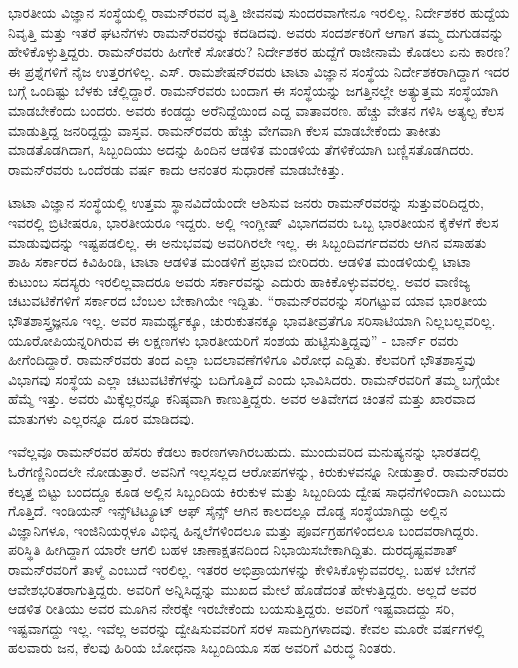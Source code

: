 ಭಾರತೀಯ ವಿಜ್ಞಾನ ಸಂಸ್ಥೆಯಲ್ಲಿ ರಾಮನ್‍ರವರ ವೃತ್ತಿ ಜೀವನವು ಸುಂದರವಾಗೇನೂ ಇರಲಿಲ್ಲ. ನಿರ್ದೇಶಕರ ಹುದ್ದೆಯ ನಿವೃತ್ತಿ ಮತ್ತು ಇತರೆ ಘಟನೆಗಳು ರಾಮನ್‍ರವರನ್ನು ಕದಡಿದವು. ಅವರು ಸಂದರ್ಶಕರಿಗೆ ಆಗಾಗ ತಮ್ಮ ದುಗುಡವನ್ನು ಹೇಳಿಕೊಳ್ಳುತ್ತಿದ್ದರು. ರಾಮನ್‍ರವರು ಹೀಗೇಕೆ ಸೋತರು? ನಿರ್ದೇಶಕರ ಹುದ್ದೆಗೆ ರಾಜೀನಾಮೆ ಕೊಡಲು ಏನು ಕಾರಣ? ಈ ಪ್ರಶ್ನೆಗಳಿಗೆ ನೈಜ ಉತ್ತರಗಳಿಲ್ಲ. ಎಸ್. ರಾಮಶೇಷನ್‍ರವರು ಟಾಟಾ ವಿಜ್ಞಾನ ಸಂಸ್ಥೆಯ ನಿರ್ದೇಶಕರಾಗಿದ್ದಾಗ ಇದರ ಬಗ್ಗೆ ಒಂದಿಷ್ಟು ಬೆಳಕು ಚೆಲ್ಲಿದ್ದಾರೆ. ರಾಮನ್‍ರವರು ಬಂದಾಗ ಈ ಸಂಸ್ಥೆಯನ್ನು ಜಗತ್ತಿನಲ್ಲೇ ಅತ್ಯುತ್ತಮ ಸಂಸ್ಥೆಯಾಗಿ ಮಾಡಬೇಕೆಂದು ಬಂದರು. ಅವರು ಕಂಡದ್ದು ಅರೆನಿದ್ದೆಯಿಂದ ಎದ್ದ ವಾತಾವರಣ. ಹೆಚ್ಚು ವೇತನ ಗಳಿಸಿ ಅತ್ಯಲ್ಪ ಕೆಲಸ ಮಾಡುತ್ತಿದ್ದ ಜನರಿದ್ದದ್ದು ವಾಸ್ತವ. ರಾಮನ್‍ರವರು ಹೆಚ್ಚು ವೇಗವಾಗಿ ಕೆಲಸ ಮಾಡಬೇಕೆಂದು ತಾಕೀತು ಮಾಡತೊಡಗಿದಾಗ, ಸಿಬ್ಬಂದಿಯು ಅದನ್ನು ಹಿಂದಿನ ಆಡಳಿತ ಮಂಡಳಿಯ ತೆಗಳಿಕೆಯಾಗಿ ಬಣ್ಣಿಸತೊಡಗಿದರು. ರಾಮನ್‍ರವರು ಒಂದೆರಡು ವರ್ಷ ಕಾದು ಆನಂತರ ಸುಧಾರಣೆ ಮಾಡಬೇಕಿತ್ತು.

ಟಾಟಾ ವಿಜ್ಞಾನ ಸಂಸ್ಥೆಯಲ್ಲಿ ಉತ್ತಮ ಸ್ಥಾನವಿದೆಯೆಂದೇ ಆಶಿಸುವ ಜನರು ರಾಮನ್‍ರವರನ್ನು ಸುತ್ತುವರಿದಿದ್ದರು, ಇವರಲ್ಲಿ ಬ್ರಿಟೀಷರೂ, ಭಾರತೀಯರೂ ಇದ್ದರು. ಅಲ್ಲಿ ಇಂಗ್ಲೀಷ್ ವಿಭಾಗದವರು ಒಬ್ಬ ಭಾರತೀಯನ ಕೈಕೆಳಗೆ ಕೆಲಸ ಮಾಡುವುದನ್ನು ಇಷ್ಟಪಡಲಿಲ್ಲ. ಈ ಅನುಭವವು ಅವರಿಗಿರಲೇ ಇಲ್ಲ. ಈ ಸಿಬ್ಬಂದಿವರ್ಗದವರು ಆಗಿನ ವಸಾಹತು ಶಾಹಿ ಸರ್ಕಾರದ ಕಿವಿಹಿಂಡಿ, ಟಾಟಾ ಆಡಳಿತ ಮಂಡಳಿಗೆ ಪ್ರಭಾವ ಬೀರಿದರು. ಆಡಳಿತ ಮಂಡಳಿಯಲ್ಲಿ ಟಾಟಾ ಕುಟುಂಬ ಸದಸ್ಯರು ಇರಲಿಲ್ಲವಾದರೂ ಅವರು ಸರ್ಕಾರವನ್ನು ಎದುರು ಹಾಕಿಕೊಳ್ಳುವವರಲ್ಲ. ಅವರ ವಾಣಿಜ್ಯ ಚಟುವಟಿಕೆಗಳಿಗೆ ಸರ್ಕಾರದ ಬೆಂಬಲ ಬೇಕಾಗಿಯೇ ಇದ್ದಿತು. “ರಾಮನ್‍ರವರನ್ನು ಸರಿಗಟ್ಟುವ ಯಾವ ಭಾರತೀಯ ಭೌತಶಾಸ್ತ್ರಜ್ಞನೂ ಇಲ್ಲ. ಅವರ ಸಾಮರ್ಥ್ಯಕ್ಕೂ, ಚುರುಕುತನಕ್ಕೂ ಭಾವತೀವ್ರತೆಗೂ ಸರಿಸಾಟಿಯಾಗಿ ನಿಲ್ಲಬಲ್ಲವರಿಲ್ಲ. ಯೂರೋಪಿಯನ್ನರಿಗಿರುವ ಈ ಲಕ್ಷಣಗಳು ಭಾರತೀಯರಿಗೆ ಸಂಶಯ ಹುಟ್ಟಿಸುತ್ತಿದ್ದವು” - ಬಾರ್ನ್ ರವರು ಹೀಗೆಂದಿದ್ದಾರೆ. ರಾಮನ್‍ರವರು ತಂದ ಎಲ್ಲಾ ಬದಲಾವಣೆಗಳಿಗೂ ವಿರೋಧ ಎದ್ದಿತು. ಕೆಲವರಿಗೆ ಭೌತಶಾಸ್ತ್ರವು ವಿಭಾಗವು ಸಂಸ್ಥೆಯ ಎಲ್ಲಾ ಚಟುವಟಿಕೆಗಳನ್ನು ಬದಿಗೊತ್ತಿದೆ ಎಂದು ಭಾವಿಸಿದರು. ರಾಮನ್‍ರವರಿಗೆ ತಮ್ಮ ಬಗ್ಗೆಯೇ ಹೆಮ್ಮೆ ಇತ್ತು. ಅವರು ಮಿಕ್ಕೆಲ್ಲರನ್ನೂ ಕನಿಷ್ಠವಾಗಿ ಕಾಣುತ್ತಿದ್ದರು. ಅವರ ಅತಿವೇಗದ ಚಿಂತನೆ ಮತ್ತು ಖಾರವಾದ ಮಾತುಗಳು ಎಲ್ಲರನ್ನೂ ದೂರ ಮಾಡಿದವು.

ಇವೆಲ್ಲವೂ ರಾಮನ್‍ರವರ ಹೆಸರು ಕೆಡಲು ಕಾರಣಗಳಾಗಿರಬಹುದು. ಮುಂದುವರಿದ ಮನುಷ್ಯನನ್ನು ಭಾರತದಲ್ಲಿ ಓರೆಗಣ್ಣಿನಿಂದಲೇ ನೋಡುತ್ತಾರೆ. ಅವನಿಗೆ ಇಲ್ಲಸಲ್ಲದ ಆರೋಪಗಳನ್ನು, ಕಿರುಕುಳವನ್ನೂ ನೀಡುತ್ತಾರೆ. ರಾಮನ್‍ರವರು ಕಲ್ಕತ್ತ ಬಿಟ್ಟು ಬಂದದ್ದೂ ಕೂಡ ಅಲ್ಲಿನ ಸಿಬ್ಬಂದಿಯ ಕಿರುಕುಳ ಮತ್ತು ಸಿಬ್ಬಂದಿಯ ದ್ವೇಷ ಸಾಧನೆಗಳಿಂದಾಗಿ ಎಂಬುದು ಗೊತ್ತಿದೆ. ಇಂಡಿಯನ್ ಇನ್ಸ್‌ಟಿಟ್ಯೂಟ್ ಆಫ್ ಸೈನ್ಸ್ ಆಗಿನ ಕಾಲದಲ್ಲೂ ದೊಡ್ಡ ಸಂಸ್ಥೆಯಾಗಿದ್ದು ಅಲ್ಲಿನ ವಿಜ್ಞಾನಿಗಳೂ, ಇಂಜಿನಿಯರ್‍ಗಳೂ ವಿಭಿನ್ನ ಹಿನ್ನಲೆಗಳಿಂದಲೂ ಮತ್ತು ಪೂರ್ವಗ್ರಹಗಳಿಂದಲೂ ಬಂದವರಾಗಿದ್ದರು. ಪರಿಸ್ಥಿತಿ ಹೀಗಿದ್ದಾಗ ಯಾರೇ ಆಗಲಿ ಬಹಳ ಚಾಣಾಕ್ಷತನದಿಂದ ನಿಭಾಯಿಸಬೇಕಾಗಿದ್ದಿತು. ದುರದೃಷ್ಟವಶಾತ್ ರಾಮನ್‍ರವರಿಗೆ ತಾಳ್ಮೆ ಎಂಬುದೆ ಇರಲಿಲ್ಲ. ಇತರರ ಅಭಿಪ್ರಾಯಗಳನ್ನು ಕೇಳಿಸಿಕೊಳ್ಳುವವರಲ್ಲ. ಬಹಳ ಬೇಗನೆ ಆವೇಶಭರಿತರಾಗುತ್ತಿದ್ದರು. ಅವರಿಗೆ ಅನ್ನಿಸಿದ್ದನ್ನು ಮುಖದ ಮೇಲೆ ಹೊಡೆದಂತೆ ಹೇಳುತ್ತಿದ್ದರು. ಅಲ್ಲದೆ ಅವರ ಆಡಳಿತ ರೀತಿಯು ಅವರ ಮೂಗಿನ ನೇರಕ್ಕೇ ಇರಬೇಕೆಂದು ಬಯಸುತ್ತಿದ್ದರು. ಅವರಿಗೆ ಇಷ್ಟವಾದದ್ದು ಸರಿ, ಇಷ್ಟವಾಗದ್ದು ಇಲ್ಲ. ಇವೆಲ್ಲ ಅವರನ್ನು ದ್ವೇಷಿಸುವವರಿಗೆ ಸರಳ ಸಾಮಗ್ರಿಗಳಾದವು. ಕೇವಲ ಮೂರೇ ವರ್ಷಗಳಲ್ಲಿ ಹಲವಾರು ಜನ, ಕೆಲವು ಹಿರಿಯ ಬೋಧನಾ ಸಿಬ್ಬಂದಿಯೂ ಸಹ ಅವರಿಗೆ ವಿರುದ್ಧ ನಿಂತರು.

